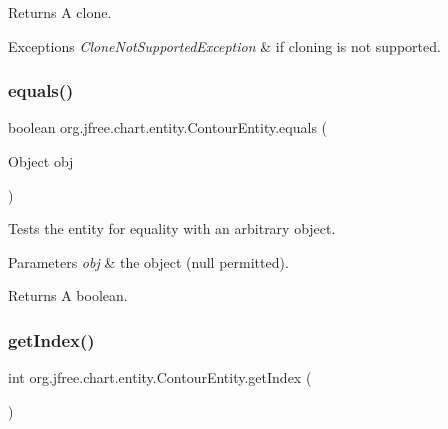 \begin{DoxyReturn}{Returns}
A clone.
\end{DoxyReturn}

\begin{DoxyExceptions}{Exceptions}
{\em Clone\+Not\+Supported\+Exception} & if cloning is not supported. \\
\hline
\end{DoxyExceptions}
\mbox{\label{classorg_1_1jfree_1_1chart_1_1entity_1_1_contour_entity_a62057918f715387eb919a4d382e6046c}} 
\subsubsection{\texorpdfstring{equals()}{equals()}}
{\footnotesize\ttfamily boolean org.\+jfree.\+chart.\+entity.\+Contour\+Entity.\+equals (\begin{DoxyParamCaption}\item[{Object}]{obj }\end{DoxyParamCaption})}

Tests the entity for equality with an arbitrary object.


\begin{DoxyParams}{Parameters}
{\em obj} & the object ({\ttfamily null} permitted).\\
\hline
\end{DoxyParams}
\begin{DoxyReturn}{Returns}
A boolean. 
\end{DoxyReturn}
\mbox{\label{classorg_1_1jfree_1_1chart_1_1entity_1_1_contour_entity_a54d1bf8e78c3b86970e776fa744fecf7}} 
\subsubsection{\texorpdfstring{get\+Index()}{getIndex()}}
{\footnotesize\ttfamily int org.\+jfree.\+chart.\+entity.\+Contour\+Entity.\+get\+Index (\begin{DoxyParamCaption}{ }\end{DoxyParamCaption})}

